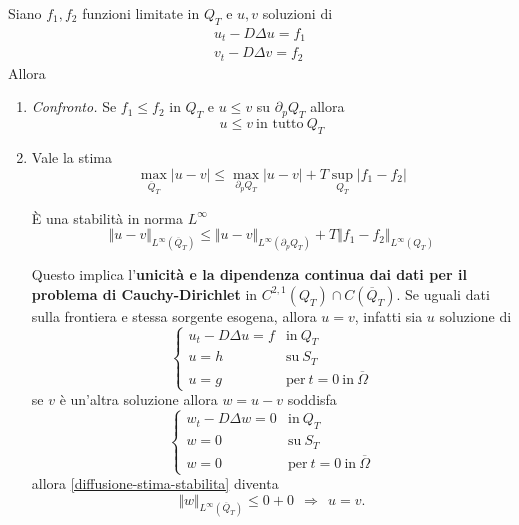 Siano $f_{1},f_{2}$ funzioni limitate in $Q_{T}$ e $u,v$ soluzioni di
\begin{gather*}
    u_{t} -D\Delta u=f_{1}\\
    v_{t} -D\Delta v=f_{2}
\end{gather*}
Allora
\begin{enumerate}
    \item \textit{Confronto.} Se $f_{1} \leq f_{2}$ in $Q_{T}$ e $u\leq v$ su $\partial _{p} Q_{T}$ allora
          \begin{equation*}
              u\leq v\ \text{in tutto} \ Q_{T}
          \end{equation*}
    \item Vale la stima
          \begin{equation*}
              \max_{\overline{Q}_{T}}| u-v| \leq \max_{\partial _{p} Q_{T}}| u-v| +T\sup _{Q_{T}}| f_{1} -f_{2}|
          \end{equation*}

          È una stabilità in norma $L^{\infty }$
          \begin{equation*}
              \Vert u-v\Vert _{L^{\infty }(\overline{Q}_{T})} \leq \Vert u-v\Vert _{L^{\infty }(\partial _{p} Q_{T})} +T\Vert f_{1} -f_{2}\Vert _{L^{\infty }(Q_{T})}
              \label{diffusione-stima-stabilita}
          \end{equation*}

          Questo implica l'\textbf{unicità e la dipendenza continua dai dati per il problema di Cauchy-Dirichlet} in $C^{2,1}(Q_{T}) \cap C(\overline{Q}_{T})$. Se uguali dati sulla frontiera e stessa sorgente esogena, allora $u=v$, infatti sia $u$ soluzione di
          \begin{equation*}
              \begin{cases}
                  u_{t} -D\Delta u=f & \text{in} \ Q_{T}                                \\
                  u=h                & \text{su} \ S_{T}                                \\
                  u=g                & \text{per} \ t=0\ \text{in} \ \overline{\Omega }
              \end{cases}
          \end{equation*}se $v$ è un'altra soluzione allora $w=u-v$ soddisfa
          \begin{equation*}
              \begin{cases}
                  w_{t} -D\Delta w=0 & \text{in} \ Q_{T}                                \\
                  w=0                & \text{su} \ S_{T}                                \\
                  w=0                & \text{per} \ t=0\ \text{in} \ \overline{\Omega }
              \end{cases}
          \end{equation*}
          allora \eqref{diffusione-stima-stabilita} diventa
          \begin{equation*}
              \Vert w\Vert _{L^{\infty }(\overline{Q}_{T})} \leq 0+0\ \ \Rightarrow \ \ u=v.
          \end{equation*}
\end{enumerate}

